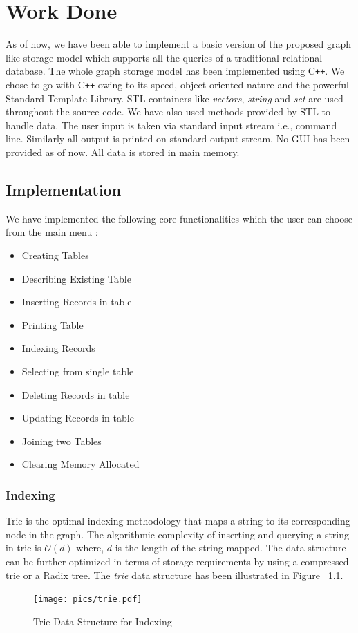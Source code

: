 \documentclass[12pt, oneside]{book}
\begin{document}
\chapter{Work Done}
As of now, we have been able to implement a basic version of the proposed graph like storage model which supports all the queries of a traditional relational database. The whole graph storage model has been implemented using C\verb!++!. We chose to go with C\verb!++! owing to its speed, object oriented nature and the powerful Standard Template Library. STL containers like \emph{vectors}, \emph{string} and \emph{set} are used throughout the source code. We have also used methods provided by STL to handle data. The user input is taken via standard input stream i.e., command line. Similarly all output is printed on standard output stream. No GUI has been provided as of now. All data is stored in main memory.
\section{Implementation}
We have implemented the following core functionalities which the user can choose from the main menu :
\begin{multicols}{2}
 \begin{itemize}
  \item Creating Tables
  \item Describing Existing Table
  \item Inserting Records in table
  \item Printing Table
  \item Indexing Records
  \item Selecting from single table
  \item Deleting Records in table
  \item Updating Records in table
  \item Joining two Tables
  \item Clearing Memory Allocated
 \end{itemize}
\end{multicols}

\subsection{Indexing}
Trie is the optimal indexing methodology that maps a string to its corresponding node in the graph. The algorithmic complexity of inserting and querying a string in trie is $\mathcal{O} \left( d\right)$ where, $d$ is the length of the string mapped. The data structure can be further optimized in terms of storage requirements by using a compressed trie or a Radix tree. The \emph{trie} data structure has been illustrated in Figure ~\ref{fig:trie}.
\begin{figure}
 \centering
 \texttt{[image: pics/trie.pdf]}
 \caption{Trie Data Structure for Indexing}
 \label{fig:trie}
\end{figure}
\end{document}
